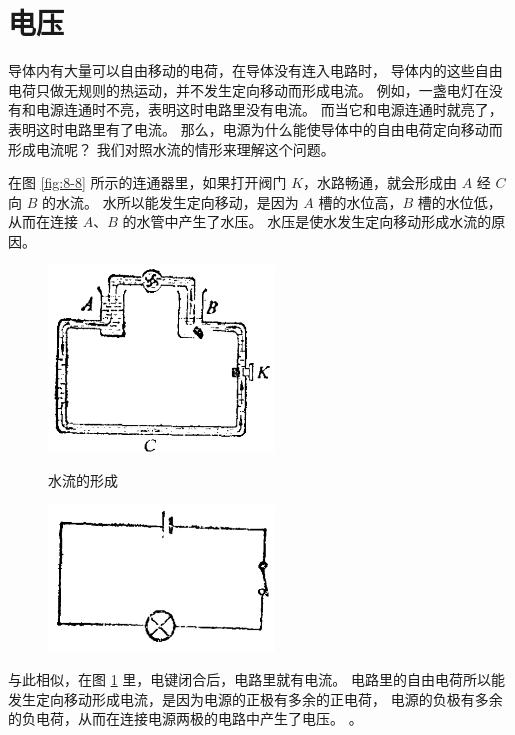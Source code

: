 \section{电压}\label{sec:8-3}

导体内有大量可以自由移动的电荷，在导体没有连入电路时，
导体内的这些自由电荷只做无规则的热运动，并不发生定向移动而形成电流。
例如，一盏电灯在没有和电源连通时不亮，表明这时电路里没有电流。
而当它和电源连通时就亮了，表明这时电路里有了电流。
那么，电源为什么能使导体中的自由电荷定向移动而形成电流呢？
我们对照水流的情形来理解这个问题。

在图 \ref{fig:8-8} 所示的连通器里，如果打开阀门 $K$，水路畅通，就会形成由 $A$ 经 $C$ 向 $B$ 的水流。
水所以能发生定向移动，是因为 $A$ 槽的水位高，$B$ 槽的水位低，从而在连接 $A$、$B$ 的水管中产生了水压。
水压是使水发生定向移动形成水流的原因。
\begin{figure}[htbp]
    \centering
    \begin{minipage}{7cm}
    \centering
    \includegraphics[width=6cm]{../pic/czwl2-ch8-8}
    \caption{水流的形成}\label{fig:8-8}
    \end{minipage}
    \qquad
    \begin{minipage}{7cm}
    \centering
    \includegraphics[width=6cm]{../pic/czwl2-ch8-9}
    \caption{}\label{fig:8-9}
    \end{minipage}
\end{figure}
与此相似，在图 \ref{fig:8-9} 里，电键闭合后，电路里就有电流。
电路里的自由电荷所以能发生定向移动形成电流，是因为电源的正极有多余的正电荷，
电源的负极有多余的负电荷，从而在连接电源两极的电路中产生了电压。
。

